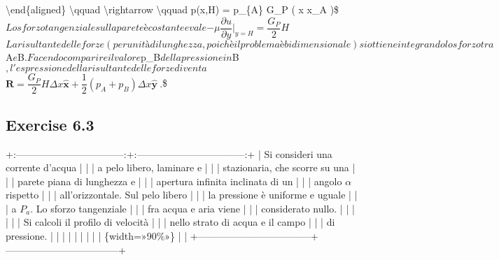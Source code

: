 \documentclass[letterpaper,10pt,italian]{jupyterBook}
\begin{document}
\begin{itemize}
\sphinxAtStartPar
\textbackslash{}end\{aligned\}
\textbackslash{}qquad \textbackslash{}rightarrow  \textbackslash{}qquad p(x,H)  = p\_\{A\} \sphinxhyphen{} G\_P ( x  \sphinxhyphen{}x\_A )\$\( Lo
sforzo tangenziale sulla parete è costante e vale
\)\(- \mu \dfrac{\partial u}{\partial y}\bigg|_{y=H} =
    \dfrac{G_P}{2} H\)\( La risultante delle forze (per unità di
lunghezza, poichè il problema è bidimensionale) si ottiene
integrando lo sforzo tra \)A\( e \)B\(. Facendo comparire il valore
\)p\_B\( della pressione in \)B\(, l'espressione della risultante delle
forze diventa \)\(\bm{R} = \dfrac{G_P}{2} H \Delta x \bm{\hat{x}} + 
           \dfrac{1}{2}(p_A + p_B) \Delta x \bm{\hat{y}} \ .\)\$

\end{itemize}

\sphinxstepscope


\subsection{Exercise 6.3}
\label{\detokenize{polimi/fluidmechanics-ita/template/capitoli/06_slnEsatte/0609in:exercise-6-3}}\label{\detokenize{polimi/fluidmechanics-ita/template/capitoli/06_slnEsatte/0609in:fluid-mechanics-exact-solutions-ex03}}\label{\detokenize{polimi/fluidmechanics-ita/template/capitoli/06_slnEsatte/0609in::doc}}
\sphinxAtStartPar
+:———————————:+:———————————:+
| Si consideri una corrente d’acqua |                                   |
| a pelo libero, laminare e         |                                   |
| stazionaria, che scorre su una    |                                   |
| parete piana di lunghezza e       |                                   |
| apertura infinita inclinata di un |                                   |
| angolo \(\alpha\) rispetto          |                                   |
| all’orizzontale. Sul pelo libero  |                                   |
| la pressione è uniforme e uguale  |                                   |
| a \(P_a\). Lo sforzo tangenziale    |                                   |
| fra acqua e aria viene            |                                   |
| considerato nullo.                |                                   |
|                                   |                                   |
| Si calcoli il profilo di velocità |                                   |
| nello strato di acqua e il campo  |                                   |
| di pressione.                     |                                   |
|                                   |                                   |
|  |                                   |
| \{width=»90\%»\}                     |                                   |
+———————————–+———————————–+
\end{document}
